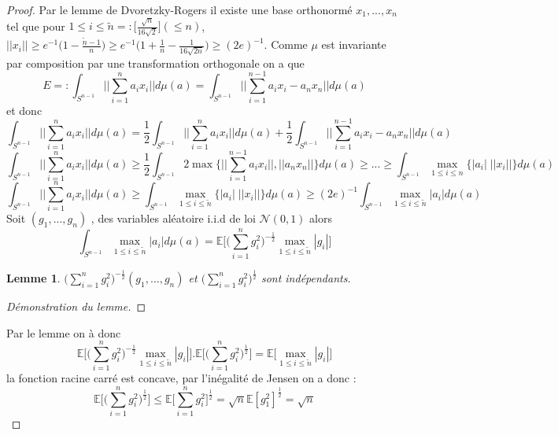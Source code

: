 \documentclass{report}
\newtheorem{lemme}{Lemme}
\newtheorem*{proposition}{Proposition}
\newcommand{\boxXx}[1]{\medskip\noindent\fbox{\begin{minipage}{\textwidth}\vspace{2pt}#1\vspace{2pt}\end{minipage}}\medskip}
\begin{document}
\boxXx{
	\begin{proposition}[Estimation de $E$]
		Il existe $c>0$ tel que $E \geq c \sqrt{\frac{\log n}{n}}$.
	\end{proposition}
}
\begin{proof}
	Par le lemme de Dvoretzky-Rogers il existe une base orthonormé $x_1,...,x_n$ tel que pour $1\leq i \leq \tilde{n}=:\big[\frac{\sqrt{n}}{16\sqrt{2}}\big](\leq n)$, $||x_i||\geq e^{-1}\Big(1-\frac{\tilde{n} -1}{n}\Big)\geq e^{-1}\Big(1+\frac{1}{n}-\frac{1}{16\sqrt{2n}}\Big)\geq (2e)^{-1} $. Comme $\mu$ est invariante par composition par une transformation orthogonale on a que  
	\begin{equation*}
		E=:\int_{S^{n-1}} ||\sum_{i=1}^{n}a_ix_i|| d\mu(a)= \int_{S^{n-1}} ||\sum_{i=1}^{n-1}a_ix_i-a_nx_n|| d\mu(a)
	\end{equation*}
	et donc 
	\begin{equation*}
		\int_{S^{n-1}} ||\sum_{i=1}^{n}a_ix_i|| d\mu(a)=\frac{1}{2}\int_{S^{n-1}} ||\sum_{i=1}^{n}a_ix_i|| d\mu(a)+ \frac{1}{2}\int_{S^{n-1}} ||\sum_{i=1}^{n-1}a_ix_i-a_nx_n|| d\mu(a)	
	\end{equation*}
	\begin{equation*}
	\int_{S^{n-1}} ||\sum_{i=1}^{n}a_ix_i|| d\mu(a)\geq\frac{1}{2}\int_{S^{n-1}} 2\max\Big\{||\sum_{i=1}^{n-1}a_ix_i||,||a_nx_n||\Big\}d\mu(a)\geq ...\geq \int_{S^{n-1}} \max_{1\leq i \leq n}\Big\{|a_i|\;||x_i||\Big\}d\mu(a) 	
	\end{equation*}
	\begin{equation*}
	\int_{S^{n-1}} ||\sum_{i=1}^{n}a_ix_i|| d\mu(a) \geq \int_{S^{n-1}} \max_{1\leq i \leq \tilde{n}}\Big\{|a_i|\;||x_i||\Big\}d\mu(a) \geq (2e)^{-1}\int_{S^{n-1}} \max_{1\leq i \leq \tilde{n}}|a_i| d\mu(a)	
	\end{equation*}
	Soit $(g_1,...,g_n)$ , des variables aléatoire i.i.d de loi $\mathcal{N}(0,1)$ alors 
	\begin{equation*}
		\int_{S^{n-1}} \max_{1\leq i \leq \tilde{n}}|a_i| d\mu(a) =\mathbb{E}\Big[\big(\sum_{i=1}^{n}g_i^2\big)^{-\frac{1}{2}} \max_{1\leq i \leq \tilde{n}}|g_i|\Big]
	\end{equation*}
	\begin{lemme}
		$\big(\sum_{i=1}^{n}g_i^2\big)^{-\frac{1}{2}}(g_1,...,g_n)$ et $\big(\sum_{i=1}^{n}g_i^2\big)^{\frac{1}{2}}$ sont indépendants.
	\end{lemme}
	\begin{proof}[\color{red}Démonstration du lemme]
	\end{proof}
	\color{black}
	Par le lemme on à donc 
	\begin{equation*}
		\mathbb{E}\Big[\big(\sum_{i=1}^{n}g_i^2\big)^{-\frac{1}{2}} \max_{1\leq i \leq \tilde{n}}|g_i|\Big] . \mathbb{E}\Big[\big(\sum_{i=1}^{n}g_i^2\big)^{\frac{1}{2}}\Big] = \mathbb{E}\big[\max_{1\leq i \leq \tilde{n}}|g_i|\big]
	\end{equation*}
	la fonction racine carré est concave, par l'inégalité de Jensen on a donc :
	\begin{equation*}
		\mathbb{E}\big[\big(\sum_{i=1}^{n}g_i^2\big)^{\frac{1}{2}}\big]\leq \mathbb{E}\big[\sum_{i=1}^{n}g_i^2\big]^{\frac{1}{2}}= \sqrt{n} \mathbb{E}[g_1^2]^{\frac{1}{2}}=\sqrt{n} 
	\end{equation*}


\end{proof}
\end{document}

